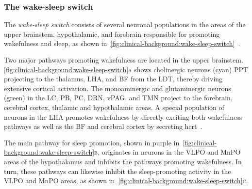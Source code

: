             
            \subsubsection{The wake-sleep switch}
            
            The \textit{wake-sleep switch} consists of several neuronal populations in the areas of the upper brainstem, hypothalamic, and forebrain responsible for promoting wakefulness and sleep, as shown in~\cref{fig:clinical-background:wake-sleep-switch}~\cite{Saper2010}.
            
            Two major pathways promoting wakefulness are located in the upper brainstem.
            \cref{fig:clinical-background:wake-sleep-switch}\textsc{\textsf{a}} shows cholinergic neurons (cyan) \ac{PPT} projecting to the thalamus, \ac{LHA}, and \ac{BF} from the \ac{LDT}, thereby driving extensive cortical activation. The monoaminergic and glutaminergic neurons (green) in the \ac{LC}, \ac{PB}, \ac{PC}, \ac{DRN}, \ac{vPAG}, and \ac{TMN} project to the forebrain, cerebral cortex, thalamic and hypothalamic areas.
            A special population of neurons in the \ac{LHA} promotes wakefulness by directly exciting both wakefulness pathways as well as the \ac{BF} and cerebral cortex by secreting \ac{hcrt}~\cite{Peyron1998}.
            
            The main pathway for sleep promotion, shown in purple in~\cref{fig:clinical-background:wake-sleep-switch}\textsc{\textsf{b}}, originates in neurons in the \ac{VLPO} and \ac{MnPO} areas of the hypothalamus and inhibits the pathways promoting wakefulness.
            In turn, these pathways can likewise inhibit the sleep-promoting activity in the \ac{VLPO} and \ac{MnPO} areas, as shown in~\cref{fig:clinical-background:wake-sleep-switch}\textsc{\textsf{c}}.
            
